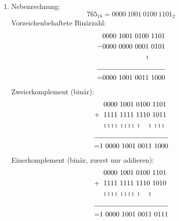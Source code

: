 \documentclass[DIN, pagenumber=false, fontsize=11pt, parskip=half]{scrartcl}
\begin{document}
    \subsection{}
    \begin{enumerate}[label = (\alph*)]
        \item Nebenrechnung: 
            \begin{equation*}
                {765}_{18} = {0000\ 1001\ 0100\ 1101}_2
            \end{equation*}
            Vorzeichenbehaftete Binärzahl:
            \begin{align*}
                & \hspace{0.0cm} 0000\ 1001\ 0100\ 1101 \\
                - & \hspace{0.0cm}0000\ 0000\ 0001\ 0101\\
                & \hspace{2.2cm} {\scriptstyle 1} \\
                \cline{1-2}  
                = & 0000\ 1001\ 0011\ 1000
            \end{align*}
            Zweierkomplement (binär):
            \begin{align*}
                & \hspace{0.2cm} 0000\ 1001\ 0100\ 1101 \\
                + & \hspace{0.2cm}1111\ 1111\ 1110\ 1011\\
                & \hspace{0.2cm} {\scriptstyle1\, 1\, 1\, 1\, \, \, 1\, 1\, 1\, 1\, \, \, 1\, \, \, \, \, \, \, \, \, 1\, \, \, 1\, 1\, 1} \\
                \cline{1-2}  
                = & 1\ 0000\ 1001\ 0011\ 1000
            \end{align*}
            Einerkomplement (binär, zuerst nur addieren):
            \begin{align*}
                & \hspace{0.2cm} 0000\ 1001\ 0100\ 1101 \\
                + & \hspace{0.2cm}1111\ 1111\ 1110\ 1010\\
                & \hspace{0.2cm} {\scriptstyle1\, 1\, 1\, 1\, \, \, 1\, 1\, 1\, 1\, \, \, 1\, \, \, \, \, \, \, \, \, 1} \\
                \cline{1-2}  
                = & 1\ 0000\ 1001\ 0011\ 0111

\end{align*}
\end{enumerate}
\end{document}
